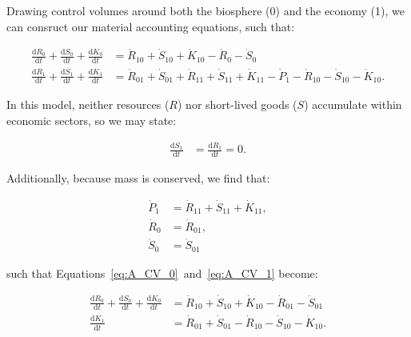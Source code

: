 Drawing control volumes around both the biosphere (0) and the economy (1), we can consruct
our material accounting equations, such that:

\begin{align} \label{eq:A_CV_0}
	\frac{\mathrm{d}R_0}{\mathrm{d}t}		
	+	\frac{\mathrm{d}S_0}{\mathrm{d}t}
	+	\frac{\mathrm{d}K_0}{\mathrm{d}t}		&	
	=	\dot{R}_{10}		
	+	\dot{S}_{10}	
	+	\dot{K}_{10}											
	-	\dot{R}_{0}											
	-	\dot{S}_{0}								\\
\label{eq:A_CV_1}
	\frac{\mathrm{d}R_{1}}{\mathrm{d}t}
	+ \frac{\mathrm{d}S_{1}}{\mathrm{d}t}
	+ \frac{\mathrm{d}K_{1}}{\mathrm{d}t}		&
	= \dot{R}_{01} 
	+ \dot{S}_{01} 
	+ \dot{R}_{11}
	+ \dot{S}_{11}
	+ \dot{K}_{11}
	- \dot{P}_{1}				
	- \dot{R}_{10}				
	- \dot{S}_{10}				
	- \dot{K}_{10}.
\end{align}

\noindent{}In this model, neither resources ($R$) 
nor short-lived goods ($S$) accumulate within economic sectors, so we may state:

\begin{align}\label{eq:A-dS_1/dt_zero}
	\frac{\mathrm{d}S_1}{\mathrm{d}t}		&
	= \frac{\mathrm{d}R_1}{\mathrm{d}t}
	= 0.
\end{align}

\noindent{}Additionally, because mass is conserved, we find that:

\begin{align} \label{eq:A_P1}
	\dot{P}_{1} 			&
	= \dot{R}_{11} 
	+ \dot{S}_{11}
	+ \dot{K}_{11},			\\
	\label{eq:A_R0}
	\dot{R}_{0}				&
	= \dot{R}_{01},			\\
	\label{eq:A_S0}
	\dot{S}_{0}				&
	= \dot{S}_{01}
\end{align}

\noindent{}such that Equations~\ref{eq:A_CV_0}~and~\ref{eq:A_CV_1} 
become:


\begin{align}\label{eq:A_CV_0b}
	\frac{\mathrm{d}R_0}{\mathrm{d}t}		
	+	\frac{\mathrm{d}S_0}{\mathrm{d}t}
	+	\frac{\mathrm{d}K_0}{\mathrm{d}t}		&	
	=	\dot{R}_{10}		
	+	\dot{S}_{10}	
	+	\dot{K}_{10}											
	-	\dot{R}_{01}											
	-	\dot{S}_{01}								\\
	\label{eq:A_CV_1b}
	\frac{\mathrm{d}K_{1}}{\mathrm{d}t}		&
	= \dot{R}_{01} 
	+ \dot{S}_{01} 
	- \dot{R}_{10}				
	- \dot{S}_{10}				
	- \dot{K}_{10}.										
\end{align}

